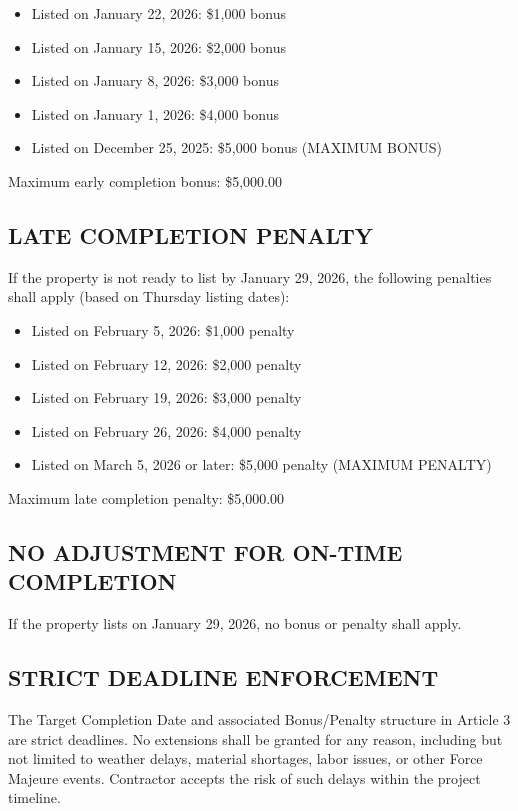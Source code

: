 \documentclass[10pt,letterpaper]{article}
\begin{document}
\begin{itemize}[leftmargin=*]
\item Listed on January 22, 2026: \$1,000 bonus
\item Listed on January 15, 2026: \$2,000 bonus
\item Listed on January 8, 2026: \$3,000 bonus
\item Listed on January 1, 2026: \$4,000 bonus
\item Listed on December 25, 2025: \$5,000 bonus (MAXIMUM BONUS)
\end{itemize}

\noindent Maximum early completion bonus: \$5,000.00

\subsection{LATE COMPLETION PENALTY}
If the property is not ready to list by January 29, 2026, the following penalties shall apply (based on Thursday listing dates):

\begin{itemize}[leftmargin=*]
\item Listed on February 5, 2026: \$1,000 penalty
\item Listed on February 12, 2026: \$2,000 penalty
\item Listed on February 19, 2026: \$3,000 penalty
\item Listed on February 26, 2026: \$4,000 penalty
\item Listed on March 5, 2026 or later: \$5,000 penalty (MAXIMUM PENALTY)
\end{itemize}

\noindent Maximum late completion penalty: \$5,000.00

\subsection{NO ADJUSTMENT FOR ON-TIME COMPLETION}
If the property lists on January 29, 2026, no bonus or penalty shall apply.

\subsection{STRICT DEADLINE ENFORCEMENT}
The Target Completion Date and associated Bonus/Penalty structure in Article 3 are strict deadlines. No extensions shall be granted for any reason, including but not limited to weather delays, material shortages, labor issues, or other Force Majeure events. Contractor accepts the risk of such delays within the project timeline.
\end{document}

